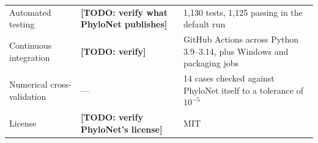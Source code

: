 \begin{tabular}{@{}p{38mm}p{52mm}p{52mm}@{}}
Automated testing
& \textbf{[TODO: verify what PhyloNet publishes]}
& 1{,}130 tests, 1{,}125 passing in the default run \\

Continuous integration
& \textbf{[TODO: verify]}
& GitHub Actions across Python 3.9--3.14, plus Windows and packaging jobs \\

Numerical cross-validation
& ---
& 14 cases checked against PhyloNet itself to a tolerance of $10^{-5}$ \\

License
& \textbf{[TODO: verify PhyloNet's license]}
& MIT \\

\bottomrule
\end{tabular}
